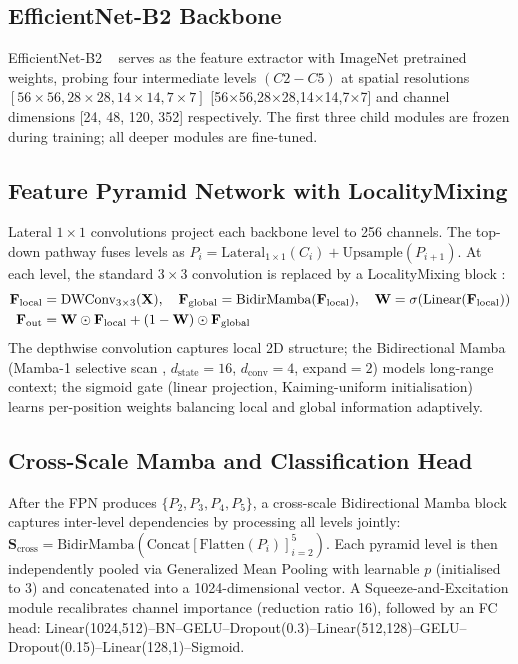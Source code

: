 \documentclass[runningheads]{llncs}
\begin{document}
\subsection{EfficientNet-B2 Backbone}
EfficientNet-B2 ~\cite{tan2019} serves as the feature extractor with ImageNet pretrained weights, probing four intermediate levels $(C2-C5)$ at spatial resolutions $[56\times56, 28\times28, 14\times14, 7\times7]$ [56×56,28×28,14×14,7×7] and channel dimensions [24, 48, 120, 352] respectively. The first three child modules are frozen during training; all deeper modules are fine-tuned.

\subsection{Feature Pyramid Network with LocalityMixing}
Lateral $1\times1$ convolutions project each backbone level to 256 channels. The top-down pathway fuses levels as $P_i = \text{Lateral}_{1\times1}(C_i) + \text{Upsample}(P_{i+1})$. At each level, the standard $3\times3$ convolution is replaced by a LocalityMixing block \cite{liang2026}:
\begin{align}
    \mathbf{F}_\text{local}  &= \text{DWConv}_{3\times3}(\mathbf{X}), \quad
    \mathbf{F}_\text{global} = \text{BidirMamba}(\mathbf{F}_\text{local}), \quad
    \mathbf{W}               = \sigma\!\left(\text{Linear}(\mathbf{F}_\text{local})\right) \notag\\
    \mathbf{F}_\text{out}    &= \mathbf{W} \odot \mathbf{F}_\text{local} + (1 - \mathbf{W}) \odot \mathbf{F}_\text{global}
\end{align}
The depthwise convolution captures local 2D structure; the Bidirectional Mamba (Mamba-1 selective scan \cite{gu2023}, $d_{\text{state}}{=}16$, $d_{\text{conv}}{=}4$, expand${=}2$) models long-range context; the sigmoid gate (linear projection, Kaiming-uniform initialisation) learns per-position weights balancing local and global information adaptively.

\subsection{Cross-Scale Mamba and Classification Head}
After the FPN produces $\{P_2, P_3, P_4, P_5\}$, a cross-scale Bidirectional Mamba block captures inter-level dependencies by processing all levels jointly: $\mathbf{S}_\text{cross} = \text{BidirMamba}(\text{Concat}[\text{Flatten}(P_i)]_{i=2}^{5})$. Each pyramid level is then independently pooled via Generalized Mean Pooling \cite{radenovic2019} with learnable $p$ (initialised to 3) and concatenated into a 1024-dimensional vector. A Squeeze-and-Excitation module \cite{hu2018} recalibrates channel importance (reduction ratio 16), followed by an FC head: Linear(1024,512)--BN--GELU--Dropout(0.3)--Linear(512,128)--GELU--Dropout(0.15)--Linear(128,1)--Sigmoid.
\end{document}
